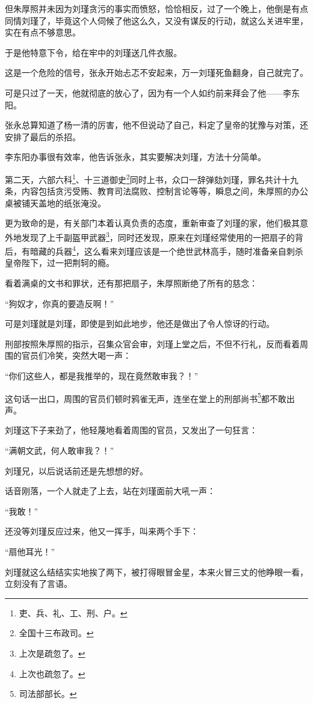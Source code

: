 \begin{multicols}{\theparacolNo}
		但朱厚照并未因为刘瑾贪污的事实而愤怒，恰恰相反，过了一个晚上，他倒是有点同情刘瑾了，毕竟这个人伺候了他这么久，又没有谋反的行动，就这么关进牢里，实在有点不够意思。

		于是他特意下令，给在牢中的刘瑾送几件衣服。

		这是一个危险的信号，张永开始忐忑不安起来，万一刘瑾死鱼翻身，自己就完了。

		可是只过了一天，他就彻底的放心了，因为有一个人如约前来拜会了他——李东阳。

		张永总算知道了杨一清的厉害，他不但说动了自己，料定了皇帝的犹豫与对策，还安排了最后的杀招。

		李东阳办事很有效率，他告诉张永，其实要解决刘瑾，方法十分简单。

		第二天，六部六科\footnote{吏、兵、礼、工、刑、户。}、十三道御史\footnote{全国十三布政司。}同时上书，众口一辞弹劾刘瑾，罪名共计十九条，内容包括贪污受贿、教育司法腐败、控制言论等等，瞬息之间，朱厚照的办公桌被铺天盖地的纸张淹没。

		更为致命的是，有关部门本着认真负责的态度，重新审查了刘瑾的家，他们极其意外地发现了上千副盔甲武器\footnote{上次是疏忽了。}，同时还发现，原来在刘瑾经常使用的一把扇子的背后，有暗藏的兵器\footnote{上次也疏忽了。}，这么看来刘瑾应该是一个绝世武林高手，随时准备亲自刺杀皇帝陛下，过一把荆轲的瘾。

		看着满桌的文书和罪状，还有那把扇子，朱厚照断绝了所有的慈念：

		“狗奴才，你真的要造反啊！”

		可是刘瑾就是刘瑾，即使是到如此地步，他还是做出了令人惊讶的行动。

		刑部按照朱厚照的指示，召集众官会审，刘瑾上堂之后，不但不行礼，反而看着周围的官员们冷笑，突然大喝一声：

		“你们这些人，都是我推举的，现在竟然敢审我？！”

		这句话一出口，周围的官员们顿时鸦雀无声，连坐在堂上的刑部尚书\footnote{司法部部长。}都不敢出声。

		刘瑾这下子来劲了，他轻蔑地看着周围的官员，又发出了一句狂言：

		“满朝文武，何人敢审我？！”

		刘瑾兄，以后说话前还是先想想的好。

		话音刚落，一个人就走了上去，站在刘瑾面前大吼一声：

		“我敢！”

		还没等刘瑾反应过来，他又一挥手，叫来两个手下：

		“扇他耳光！”

		刘瑾就这么结结实实地挨了两下，被打得眼冒金星，本来火冒三丈的他睁眼一看，立刻没有了言语。


\end{multicols}
